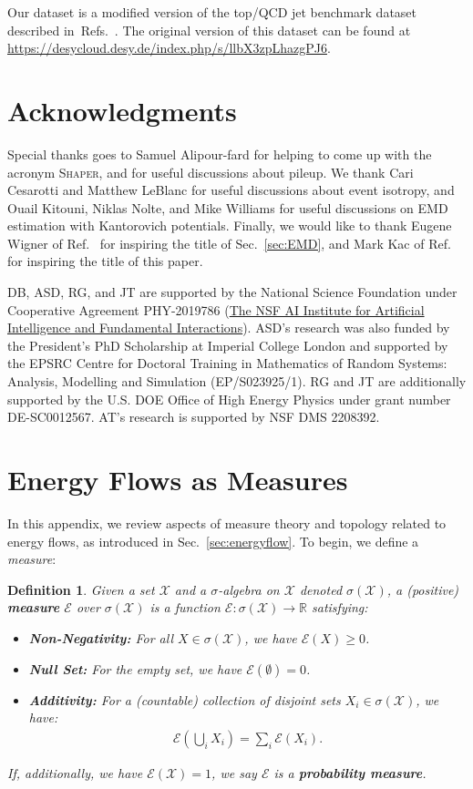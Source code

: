\documentclass[letterpaper,11pt]{article}
\newcommand{\E}{\mathcal{E}}
\newcommand{\X}{\mathcal{X}}
\DeclareRobustCommand{\Sec}[1]{Sec.~\ref{sec:#1}}
\DeclareRobustCommand{\Refer}[1]{Ref.~\cite{#1}}
\DeclareRobustCommand{\Refers}[1]{Refs.~\cite{#1}}
\newtheorem{definition}{Definition}
\newcommand{\Shaper}{\textsc{Shaper}\xspace}
\begin{document}
Our dataset is a modified version of the top/QCD jet benchmark dataset described in~\Refers{Butter:2017cot,Kasieczka:2019dbj}. The original version of this dataset can be found at \url{https://desycloud.desy.de/index.php/s/llbX3zpLhazgPJ6}. 


\section*{Acknowledgments}

Special thanks goes to Samuel Alipour-fard for helping to come up with the acronym \Shaper, and for useful discussions about pileup. We thank Cari Cesarotti and Matthew LeBlanc for useful discussions about event isotropy, and Ouail Kitouni, Niklas Nolte, and Mike Williams for useful discussions on EMD estimation with Kantorovich potentials. Finally, we would like to thank Eugene Wigner of \Refer{Wigner:1960kfi} for inspiring the title of \Sec{EMD}, and Mark Kac of \Refer{10.2307/2313748} for inspiring the title of this paper. 

DB, ASD, RG, and JT are supported by the National Science Foundation under Cooperative Agreement PHY-2019786 (\href{http://iaifi.org/}{The NSF AI Institute for Artificial Intelligence and Fundamental Interactions}). ASD's research was also funded by the President’s PhD Scholarship at Imperial College London and supported by the EPSRC Centre for Doctoral Training in Mathematics of Random Systems: Analysis, Modelling and Simulation (EP/S023925/1). RG and JT are additionally supported by the U.S. DOE Office of High Energy Physics under grant number DE-SC0012567. AT's research is supported by NSF DMS 2208392.



\appendix

\section{Energy Flows as Measures}\label{app:measure_theory}


In this appendix, we review aspects of measure theory and topology related to energy flows, as introduced in \Sec{energyflow}.
%
To begin, we define a \emph{measure}:
%
\begin{definition}
Given a set $\X$ and a $\sigma$-algebra on $\X$ denoted $\sigma(\X)$, a (positive) \textbf{measure} $\E$ over $\sigma(\X)$ is a function $\E:\sigma(\X)\to\mathbb{R}$ satisfying:
%
\begin{itemize}
    \item \textbf{Non-Negativity:} For all $X \in \sigma(\X)$, we have $\E(X) \geq 0$.
    \item \textbf{Null Set:} For the empty set, we have $\E(\emptyset) = 0$.
    \item \textbf{Additivity:} For a (countable) collection of disjoint sets $X_i \in \sigma(\X)$, we have:
    \begin{align}
        \E\left(\bigcup_i X_i\right) = \sum_i \E(X_i).
    \end{align}
\end{itemize}
%
If, additionally, we have $\E(\X) = 1$, we say $\E$ is a \textbf{probability measure}.
%
\end{definition}
\end{document}

